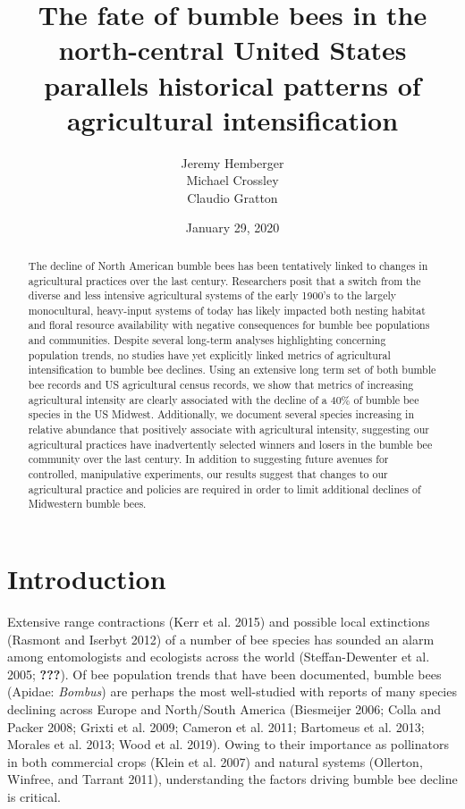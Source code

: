 \documentclass[11pt,]{article}
\title{\textbf{The fate of bumble bees in the north-central United States
parallels historical patterns of agricultural intensification}}
\author{Jeremy Hemberger \\ Michael Crossley \\ Claudio Gratton}
\date{January 29, 2020}
\begin{document}
\maketitle
\begin{abstract}
The decline of North American bumble bees has been tentatively linked to
changes in agricultural practices over the last century. Researchers
posit that a switch from the diverse and less intensive agricultural
systems of the early 1900's to the largely monocultural, heavy-input
systems of today has likely impacted both nesting habitat and floral
resource availability with negative consequences for bumble bee
populations and communities. Despite several long-term analyses
highlighting concerning population trends, no studies have yet
explicitly linked metrics of agricultural intensification to bumble bee
declines. Using an extensive long term set of both bumble bee records
and US agricultural census records, we show that metrics of increasing
agricultural intensity are clearly associated with the decline of a 40\%
of bumble bee species in the US Midwest. Additionally, we document
several species increasing in relative abundance that positively
associate with agricultural intensity, suggesting our agricultural
practices have inadvertently selected winners and losers in the bumble
bee community over the last century. In addition to suggesting future
avenues for controlled, manipulative experiments, our results suggest
that changes to our agricultural practice and policies are required in
order to limit additional declines of Midwestern bumble bees.
\end{abstract}

\captionsetup[table]{labelformat=empty}

\hypertarget{introduction}{%
\section{Introduction}\label{introduction}}

Extensive range contractions (Kerr et al. 2015) and possible local
extinctions (Rasmont and Iserbyt 2012) of a number of bee species has
sounded an alarm among entomologists and ecologists across the world
(Steffan-Dewenter et al. 2005; {\textbf{???}}). Of bee population trends
that have been documented, bumble bees (Apidae: \emph{Bombus}) are
perhaps the most well-studied with reports of many species declining
across Europe and North/South America (Biesmeijer 2006; Colla and Packer
2008; Grixti et al. 2009; Cameron et al. 2011; Bartomeus et al. 2013;
Morales et al. 2013; Wood et al. 2019). Owing to their importance as
pollinators in both commercial crops (Klein et al. 2007) and natural
systems (Ollerton, Winfree, and Tarrant 2011), understanding the factors
driving bumble bee decline is critical.
\end{document}
